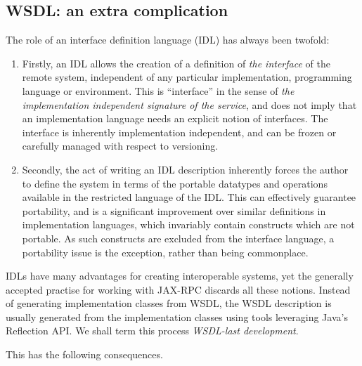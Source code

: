 \subsection{WSDL: an extra complication}
\label{objections:wsdl-gen}

The role of an interface definition language (IDL) has always been
twofold:

\begin{enumerate}
\item Firstly, an IDL allows the creation of a definition of \emph{the
interface} of the remote system, independent of any particular
implementation, programming language or environment. This is
``interface'' in the sense of \emph{the implementation independent
signature of the service}, and does not imply that an implementation
language needs an explicit notion of interfaces. The interface is
inherently implementation independent, and can be frozen or carefully
managed with respect to versioning.

\item Secondly, the act of writing an IDL description inherently
forces the author to define the system in terms of the portable
datatypes and operations available in the restricted language of the
IDL.  This can effectively guarantee portability, and is a significant
improvement over similar definitions in implementation languages,
which invariably contain constructs which are not portable. As such
constructs are excluded from the interface language, a portability
issue is the exception, rather than being commonplace.
\end{enumerate}

IDLs have many advantages for creating interoperable systems, yet the
generally accepted practise for working with JAX-RPC discards all
these notions. Instead of generating implementation classes from WSDL,
the WSDL description is usually generated from the implementation
classes using tools leveraging Java's Reflection API. We shall term
this process \emph{WSDL-last development}.

This has the following consequences.

